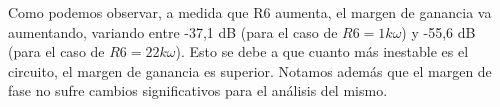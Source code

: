 \documentclass[e4_tp2_main.tex]{subfiles}
\begin{document}
   
 

Como podemos observar, a medida que R6 aumenta, el margen de ganancia va aumentando, variando entre -37,1 dB (para el caso de $R6=1 k\omega$) y -55,6 dB (para el caso de $ R6=22 k\omega$).
Esto se debe a que cuanto más inestable es el circuito, el margen de ganancia es superior.
Notamos además que el margen de fase no sufre cambios significativos para el análisis del mismo.
\end{document}
